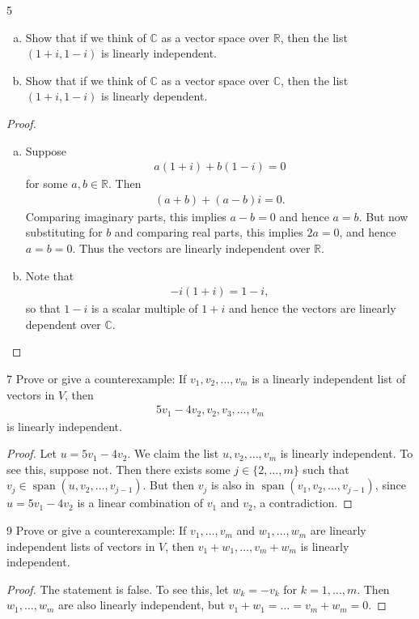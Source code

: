 \documentclass{extarticle}
\newenvironment{problem}[1]{\begin{prob*}{#1}{}}{\end{prob*}}
\newcommand{\R}{\mathbb{R}}
\newcommand{\C}{\mathbb{C}}
\DeclareMathOperator{\Span}{span}
\begin{document}
\begin{problem}{5}
\begin{enumerate}[(a)]
\item Show that if we think of $\C$ as a vector space over $\R$, then the list $(1 + i, 1 - i)$ is linearly independent.
\item Show that if we think of $\C$ as a vector space over $\C$, then the list $(1+ i, 1- i)$ is linearly dependent.
\end{enumerate}
\end{problem}
\begin{proof}
\begin{enumerate}[(a)]
\item Suppose 
\begin{align*}
a(1 + i) + b(1 - i) = 0
\end{align*}
for some $a,b\in\R$.  Then
\begin{align*}
(a + b) + (a - b)i = 0.
\end{align*}
Comparing imaginary parts, this implies $a-b = 0$ and hence $a=b$.  But now substituting for $b$ and comparing real parts, this implies $2a = 0$, and hence $a=b=0$.  Thus the vectors are linearly independent over $\R$.
\item Note that 
\begin{align*}
-i(1+ i) = 1 - i,
\end{align*}
so that $1-i$ is a scalar multiple of $1+i$ and hence the vectors are linearly dependent over $\C$. \qedhere
\end{enumerate}
\end{proof}

\begin{problem}{7}
Prove or give a counterexample: If $v_1,v_2,\dots, v_m$ is a linearly independent list of vectors in $V$, then
\begin{align*}
5v_1-4v_2, v_2, v_3, \dots, v_m
\end{align*}
is linearly independent.
\end{problem}
\begin{proof}
Let $u = 5v_1-4v_2$.  We claim the list $u, v_2, \dots, v_m$ is linearly independent.  To see this, suppose not.  Then there exists some $j\in \{2,\dots, m\}$ such that $v_j\in \Span(u, v_2, \dots, v_{j-1})$.  But then $v_j$ is also in $\Span(v_1, v_2,\dots, v_{j-1})$, since $u = 5v_1-4v_2$ is a linear combination of $v_1$ and $v_2$, a contradiction.
\end{proof}

\begin{problem}{9}
Prove or give a counterexample: If $v_1,\dots,v_m$ and $w_1,\dots, w_m$ are linearly independent lists of vectors in $V$, then $v_1+w_1, \dots, v_m + w_m$ is linearly independent.
\end{problem}
\begin{proof}
The statement is false.  To see this, let $w_k = -v_k$ for $k=1,\dots, m$.  Then $w_1,\dots, w_m$ are also linearly independent, but $v_1+w_1 = \dots = v_m + w_m = 0$.
\end{proof}
\end{document}
